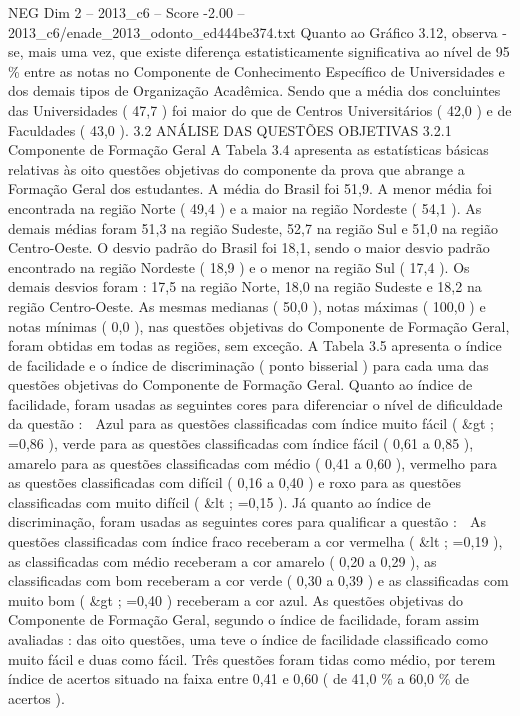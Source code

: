\begin{textsample}{NEG Dim 2 – 2013\_c6 – Score -2.00 – 2013\_c6/enade\_2013\_odonto\_ed444be374.txt}
Quanto ao Gráfico 3.12, observa -se, mais uma vez, que existe diferença estatisticamente significativa ao nível de 95 \% entre as notas no Componente de Conhecimento Específico de Universidades e dos demais tipos de Organização Acadêmica.
Sendo que a média dos concluintes das Universidades ( 47,7 ) foi maior do que de Centros Universitários ( 42,0 ) e de Faculdades ( 43,0 ). 3.2 ANÁLISE DAS QUESTÕES OBJETIVAS 3.2.1 Componente de Formação Geral A Tabela 3.4 apresenta as estatísticas básicas relativas às oito questões objetivas do componente da prova que abrange a Formação Geral dos estudantes.
A média do Brasil foi 51,9.
A menor média foi encontrada na região Norte ( 49,4 ) e a maior na região Nordeste ( 54,1 ).
As demais médias foram 51,3 na região Sudeste, 52,7 na região Sul e 51,0 na região Centro-Oeste.
O desvio padrão do Brasil foi 18,1, sendo o maior desvio padrão encontrado na região Nordeste ( 18,9 ) e o menor na região Sul ( 17,4 ).
Os demais desvios foram : 17,5 na região Norte, 18,0 na região Sudeste e 18,2 na região Centro-Oeste.
As mesmas medianas ( 50,0 ), notas máximas ( 100,0 ) e notas mínimas ( 0,0 ), nas questões objetivas do Componente de Formação Geral, foram obtidas em todas as regiões, sem exceção.
A Tabela 3.5 apresenta o índice de facilidade e o índice de discriminação ( ponto bisserial ) para cada uma das questões objetivas do Componente de Formação Geral.
Quanto ao índice de facilidade, foram usadas as seguintes cores para diferenciar o nível de dificuldade da questão :  Azul para as questões classificadas com índice muito fácil ( \&gt ; =0,86 ), verde para as questões classificadas com índice fácil ( 0,61 a 0,85 ), amarelo para as questões classificadas com médio ( 0,41 a 0,60 ), vermelho para as questões classificadas com difícil ( 0,16 a 0,40 ) e roxo para as questões classificadas com muito difícil ( \&lt ; =0,15 ).
Já quanto ao índice de discriminação, foram usadas as seguintes cores para qualificar a questão :  As questões classificadas com índice fraco receberam a cor vermelha ( \&lt ; =0,19 ), as classificadas com médio receberam a cor amarelo ( 0,20 a 0,29 ), as classificadas com bom receberam a cor verde ( 0,30 a 0,39 ) e as classificadas com muito bom ( \&gt ; =0,40 ) receberam a cor azul.
As questões objetivas do Componente de Formação Geral, segundo o índice de facilidade, foram assim avaliadas : das oito questões, uma teve o índice de facilidade classificado como muito fácil e duas como fácil.
Três questões foram tidas como médio, por terem índice de acertos situado na faixa entre 0,41 e 0,60 ( de 41,0 \% a 60,0 \% de acertos ).

\end{textsample}
